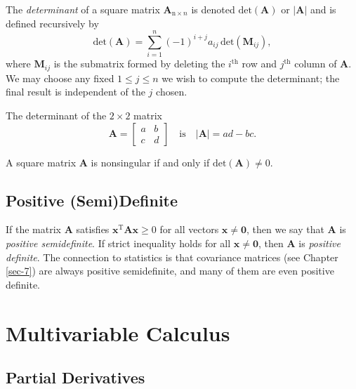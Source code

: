 \documentclass[captions=tableheading]{scrbook}
\begin{document}
\begin{example}
\begin{defn}
The \emph{determinant} of a square matrix \(\mathbf{A}_{\mathrm{n}\times n}\) is denoted \(\mathrm{det}(\mathbf{A})\) or \(|\mathbf{A}|\) and is defined recursively by
\begin{equation}
\mathrm{det}(\mathbf{A})=\sum_{i=1}^{n}(-1)^{i+j}a_{ij}\,\mathrm{det}(\mathbf{M}_{ij}),
\end{equation}
where \(\mathbf{M}_{ij}\) is the submatrix formed by deleting the \(i^{\mathrm{th}}\) row and \(j^{\mathrm{th}}\) column of \(\mathbf{A}\). We may choose any fixed \(1\leq j\leq n\) we wish to compute the determinant; the final result is independent of the \(j\) chosen.
\end{defn}
\begin{fact}
The determinant of the \(2\times2\) matrix
\begin{equation}
\mathbf{A}=\begin{bmatrix}a & b\\
c & d\end{bmatrix}\quad \mbox{is} \quad |\mathbf{A}|=ad-bc.
\end{equation}
\end{fact}

\begin{fact}
A square matrix \(\mathbf{A}\) is nonsingular if and only if \(\mathrm{det}(\mathbf{A})\neq0\).
\end{fact}
\subsection{Positive (Semi)Definite}
\label{sec-21-5-3}

If the matrix \(\mathbf{A}\) satisfies \(\mathbf{x^{\mathrm{T}}}\mathbf{A}\mathbf{x}\geq0\) for all vectors \(\mathbf{x}\neq\mathbf{0}\), then we say that \(\mathbf{A}\) is \emph{positive semidefinite}. If strict inequality holds for all \(\mathbf{x}\neq\mathbf{0}\), then \(\mathbf{A}\) is \emph{positive definite}. The connection to statistics is that covariance matrices (see Chapter \ref{sec-7}) are always positive semidefinite, and many of them are even positive definite.
\section{Multivariable Calculus}
\label{sec-21-6}
\label{sec-Multivariable-Calculus}
\subsection{Partial Derivatives}
\label{sec-21-6-1}


\end{example}
\end{document}
